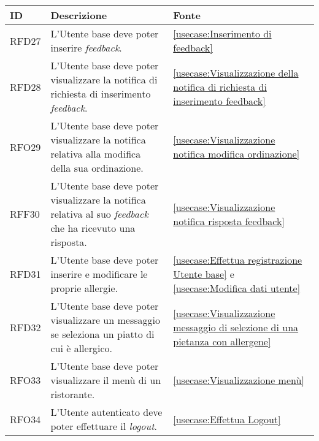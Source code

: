 \begin{table}[H]
	\renewcommand{\arraystretch}{1.5}
	\centering
	\begin{tabularx}{\textwidth}{l|X|p{2cm}}
		\textbf{ID} & \textbf{Descrizione}                                                                                                 & \textbf{Fonte}                                                                                \\
		\hline
		RFD27       & L'Utente base deve poter inserire \textit{feedback}.                                                                 & \autoref{usecase:Inserimento di feedback}                                                     \\
		\hline
		RFD28       & L'Utente base deve poter visualizzare la notifica di richiesta di inserimento \textit{feedback}.                     & \autoref{usecase:Visualizzazione della notifica di richiesta di inserimento feedback}         \\
		\hline
		RFO29       & L'Utente base deve poter visualizzare la notifica relativa alla modifica della sua ordinazione.                      & \autoref{usecase:Visualizzazione notifica modifica ordinazione}                               \\
		\hline
		RFF30       & L'Utente base deve poter visualizzare la notifica relativa al suo \textit{feedback} che ha ricevuto una risposta.    & \autoref{usecase:Visualizzazione notifica risposta feedback}                                  \\
		\hline
		RFD31       & L'Utente base deve poter inserire e modificare le proprie allergie.                                                  & \autoref{usecase:Effettua registrazione Utente base} e \autoref{usecase:Modifica dati utente} \\
		\hline
		RFD32       & L'Utente base deve poter visualizzare un messaggio se seleziona un piatto di cui è allergico.                        & \autoref{usecase:Visualizzazione messaggio di selezione di una pietanza con allergene}        \\
		\hline
		RFO33       & L'Utente base deve poter visualizzare il menù di un ristorante.                                                      & \autoref{usecase:Visualizzazione menù}                                                        \\
		\hline
		RFO34       & L'Utente autenticato deve poter effettuare il \textit{logout}.                                                       & \autoref{usecase:Effettua Logout}                                                             \\

\end{tabularx}
\end{table}
